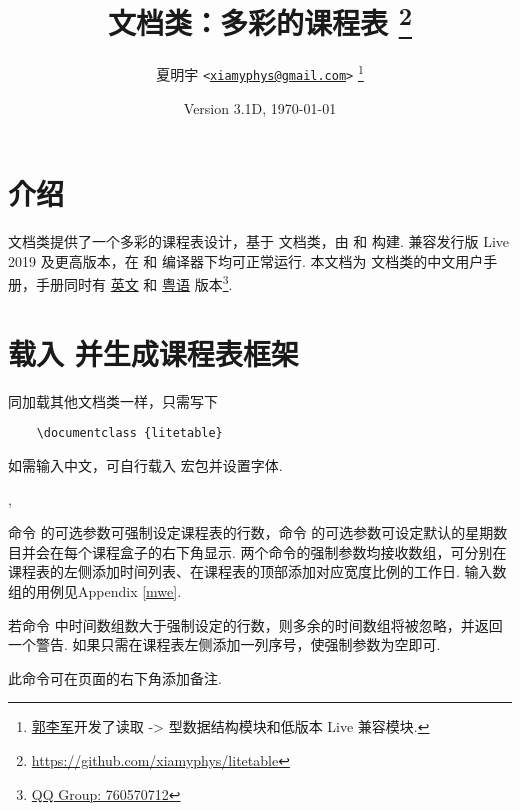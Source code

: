 \documentclass[letterpaper]{l3doc}
\title
{
  \bfseries\cls{litetable} 文档类：多彩的课程表
  \thanks{\url{https://github.com/xiamyphys/litetable}}
}
\author
{
  夏明宇 \texttt{<\href{mailto:xiamyphys@gmail.com}{xiamyphys@gmail.com}>}
  \thanks{\href{https://github.com/ljguo1020}{郭李军}开发了读取 \meta{left} -> \meta{right} 型数据结构模块和低版本 \hologo{TeX} Live 兼容模块.}
}
\date{Version 3.1D, \today}
\begin{document}
\maketitle

\section{介绍}

 文档类提供了一个多彩的课程表设计，基于  文档类，由  和  构建. 兼容发行版  Live 2019 及更高版本，在  和  编译器下均可正常运行. 本文档为  文档类的中文用户手册，手册同时有 \href{./litetable-en.pdf}{英文} 和 \href{./litetable-hk.pdf}{粤语} 版本\footnote{\href{https://qm.qq.com/q/RyssAhG4qy}{QQ Group: 760570712}}.

\section{载入  并生成课程表框架}

同加载其他文档类一样，只需写下

\begin{framed}
  \begin{verbatim}
    \documentclass {litetable}
  \end{verbatim}
\end{framed}

如需输入中文，可自行载入  宏包并设置字体.

\begin{function}{\timelist,\weeklist}
  \begin{syntax}
                    
           
  \end{syntax}

  命令  的可选参数可强制设定课程表的行数，命令  的可选参数可设定默认的星期数目并会在每个课程盒子的右下角显示. 两个命令的强制参数均接收数组，可分别在课程表的左侧添加时间列表、在课程表的顶部添加对应宽度比例的工作日. 输入数组的用例见Appendix \ref{mwe}.

  若命令  中时间数组数大于强制设定的行数，则多余的时间数组将被忽略，并返回一个警告. 如果只需在课程表左侧添加一列序号，使强制参数为空即可.
\end{function}

\begin{function}{\more}
  \begin{syntax}
     
  \end{syntax}

  此命令可在页面的右下角添加备注.
\end{function}
\end{document}
